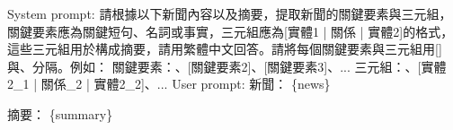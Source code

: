 \vspace{3mm}
\noindent
\begin{tcolorbox}[promptstyle, title={Prompt for generating V3 essential aspects and triples}, fonttitle=\promptTitleFontSize, fontupper=\promptContentFontSize]
System prompt:\newline
請根據以下新聞內容以及摘要，提取新聞的關鍵要素與三元組，關鍵要素應為關鍵短句、名詞或事實，三元組應為[實體1 | 關係 | 實體2]的格式，這些三元組用於構成摘要，請用繁體中文回答。請將每個關鍵要素與三元組用[]與、分隔。例如：\newline
關鍵要素：\newline
[關鍵要素1]、[關鍵要素2]、[關鍵要素3]、...\newline
\newline
三元組：\newline
[實體1\_1 | 關係\_1 | 實體1\_2]、[實體2\_1 | 關係\_2 | 實體2\_2]、...\newline
\newline
User prompt:\newline
新聞：\newline
\{news\}\newline

摘要：\newline
\{summary\}
\end{tcolorbox}

